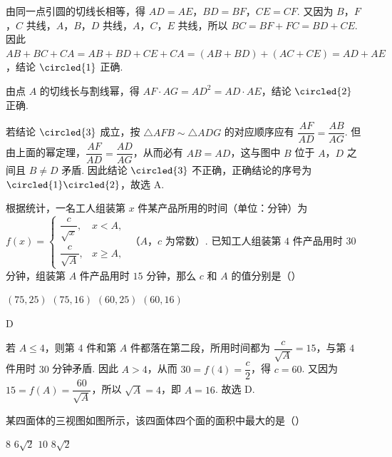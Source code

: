 \begin{solution}
由同一点引圆的切线长相等，得 \(AD=AE\)，\(BD=BF\)，\(CE=CF\). 又因为 \(B\)，\(F\)，\(C\) 共线，\(A\)，\(B\)，\(D\) 共线，\(A\)，\(C\)，\(E\) 共线，所以 \(BC=BF+FC=BD+CE\). 因此
\(AB+BC+CA=AB+BD+CE+CA=(AB+BD)+(AC+CE)=AD+AE\)，结论 \(\circled{1}\) 正确.

由点 \(A\) 的切线长与割线幂，得 \(AF\cdot AG=AD^2=AD\cdot AE\)，结论 \(\circled{2}\) 正确.

若结论 \(\circled{3}\) 成立，按 \(\triangle AFB\sim\triangle ADG\) 的对应顺序应有 \(\dfrac{AF}{AD}=\dfrac{AB}{AG}\). 但由上面的幂定理，\(\dfrac{AF}{AD}=\dfrac{AD}{AG}\)，从而必有 \(AB=AD\)，这与图中 \(B\) 位于 \(A\)，\(D\) 之间且 \(B\ne D\) 矛盾. 因此结论 \(\circled{3}\) 不正确，正确结论的序号为 \(\circled{1}\circled{2}\)，故选 A.
\end{solution}

\begin{problem}
根据统计，一名工人组装第 \(x\) 件某产品所用的时间（单位：分钟）为
\(f(x) = \begin{cases}
\dfrac{c}{\sqrt{x}}, & x < A,\\
\dfrac{c}{\sqrt{A}}, & x \geqslant A,
\end{cases}\)
（\(A\)，\(c\) 为常数）. 已知工人组装第 \(4\) 件产品用时 \(30\) 分钟，组装第 \(A\) 件产品用时 \(15\) 分钟，那么 \(c\) 和 \(A\) 的值分别是（\quad）

\choices
    {\((75, 25)\)}
    {\((75, 16)\)}
    {\((60, 25)\)}
    {\((60, 16)\)}
\end{problem}

\begin{answer}
D
\end{answer}

\begin{solution}
若 \(A\leqslant4\)，则第 \(4\) 件和第 \(A\) 件都落在第二段，所用时间都为 \(\dfrac{c}{\sqrt A}=15\)，与第 \(4\) 件用时 \(30\) 分钟矛盾. 因此 \(A>4\)，从而 \(30=f(4)=\dfrac{c}{2}\)，得 \(c=60\). 又因为 \(15=f(A)=\dfrac{60}{\sqrt A}\)，所以 \(\sqrt A=4\)，即 \(A=16\). 故选 D.
\end{solution}

\begin{problem}
某四面体的三视图如图所示，该四面体四个面的面积中最大的是（\quad）


\choices
    {\(8\)}
    {\(6\sqrt{2}\)}
    {\(10\)}
    {\(8\sqrt{2}\)}
\end{problem}

